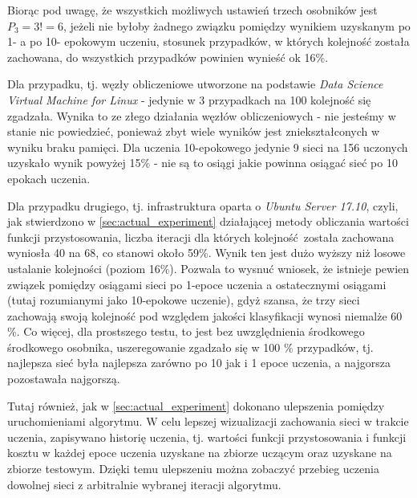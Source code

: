 Biorąc pod uwagę, że wszystkich możliwych ustawień trzech osobników jest $P_3 = 3! = 6$, jeżeli nie byłoby żadnego związku pomiędzy wynikiem uzyskanym po 1- a po 10- epokowym uczeniu, stosunek przypadków, w których kolejność została zachowana, do wszystkich przypadków powinien wynieść ok 16\%.

Dla przypadku, tj. węzły obliczeniowe utworzone na podstawie \textit{Data Science Virtual Machine for Linux} - jedynie w 3 przypadkach na 100 kolejność się zgadzała. Wynika to ze złego działania węzłów obliczeniowych - nie jesteśmy w stanie nic powiedzieć, ponieważ zbyt wiele wyników jest zniekształconych w wyniku braku pamięci.
Dla uczenia 10-epokowego jedynie 9 sieci na 156 uczonych uzyskało wynik powyżej 15\% - nie są to osiągi jakie powinna osiągać sieć po 10 epokach uczenia.

Dla przypadku drugiego, tj. infrastruktura oparta o \textit{Ubuntu Server 17.10}, czyli, jak stwierdzono w \ref{sec:actual_experiment} działającej metody obliczania wartości funkcji przystosowania, liczba iteracji dla których kolejność została zachowana wyniosła 40 na 68, co stanowi około 59\%.
Wynik ten jest dużo wyższy niż losowe ustalanie kolejności (poziom 16\%).
Pozwala to wysnuć wniosek, że istnieje pewien związek pomiędzy osiągami sieci po 1-epoce uczenia a ostatecznymi osiągami (tutaj rozumianymi jako 10-epokowe uczenie), gdyż szansa, że trzy sieci zachowają swoją kolejność pod względem jakości klasyfikacji wynosi niemalże 60 \%.
Co więcej, dla prostszego testu, to jest bez uwzględnienia środkowego środkowego osobnika, uszeregowanie zgadzało się w 100 \% przypadków, tj. najlepsza sieć była najlepsza zarówno po 10 jak i 1 epoce uczenia, a najgorsza pozostawała najgorszą.

Tutaj również, jak w \ref{sec:actual_experiment} dokonano ulepszenia pomiędzy uruchomieniami algorytmu.
W celu lepszej wizualizacji zachowania sieci w trakcie uczenia, zapisywano historię uczenia, tj. wartości funkcji przystosowania i funkcji kosztu w każdej epoce uczenia uzyskane na zbiorze uczącym oraz uzyskane na zbiorze testowym.
Dzięki temu ulepszeniu można zobaczyć przebieg uczenia dowolnej sieci z arbitralnie wybranej iteracji algorytmu.

